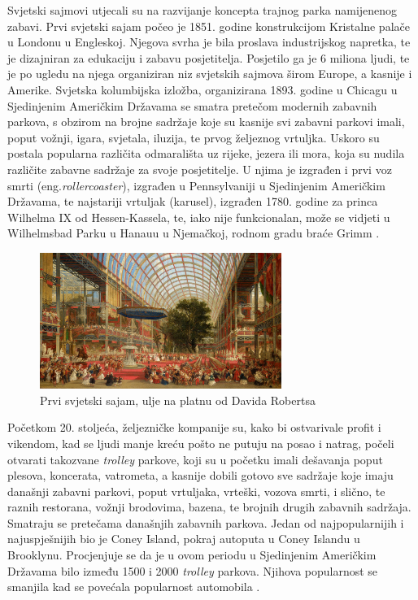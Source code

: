 Svjetski sajmovi utjecali su na razvijanje koncepta trajnog parka namijenenog zabavi. Prvi svjetski sajam počeo je 1851. godine konstrukcijom Kristalne palače u Londonu u Engleskoj. Njegova svrha je bila proslava industrijskog napretka, te je dizajniran za edukaciju i zabavu posjetitelja. Posjetilo ga je 6 miliona ljudi, te je po ugledu na njega organiziran niz svjetskih sajmova širom Europe, a kasnije i Amerike. Svjetska kolumbijska izložba, organizirana 1893. godine u Chicagu u Sjedinjenim Američkim Državama se smatra pretečom modernih zabavnih parkova, s obzirom na brojne sadržaje koje su kasnije svi zabavni parkovi imali, poput vožnji, igara, svjetala, iluzija, te prvog željeznog vrtuljka\cite{worldfairs}. Uskoro su postala popularna različita odmarališta uz rijeke, jezera ili mora, koja su nudila različite zabavne sadržaje za svoje posjetitelje. U njima je izgrađen i prvi voz smrti (eng.\textit{rollercoaster}), izgrađen u Pennsylvaniji u Sjedinjenim Američkim Državama, te najstariji vrtuljak (karusel), izgrađen 1780. godine za princa Wilhelma IX od Hessen-Kassela, te, iako nije funkcionalan, može se vidjeti u Wilhelmsbad Parku u Hanauu u Njemačkoj, rodnom gradu braće Grimm \cite{900years}. 

\begin{figure}[h!]
  \centering
  \includegraphics[width=0.7\textwidth]{fair}
  \caption{Prvi svjetski sajam, ulje na platnu od Davida Robertsa \cite{rct}}
  \label{fig:Slika_sajaml}
\end{figure}

Početkom 20. stoljeća, željezničke kompanije su, kako bi ostvarivale profit i vikendom, kad se ljudi manje kreću pošto ne putuju na posao i natrag, počeli otvarati takozvane \textit{trolley} parkove, koji su u početku imali dešavanja poput plesova, koncerata, vatrometa, a kasnije dobili gotovo sve sadržaje koje imaju današnji zabavni parkovi, poput vrtuljaka, vrteški, vozova smrti, i slično, te raznih restorana, vožnji brodovima, bazena, te brojnih drugih zabavnih sadržaja. Smatraju se pretečama današnjih zabavnih parkova. Jedan od najpopularnijih i najuspješnijih bio je Coney Island, pokraj autoputa u Coney Islandu u Brooklynu. Procjenjuje se da je u ovom periodu u Sjedinjenim Američkim Državama bilo između 1500 i 2000 \textit{trolley} parkova. Njihova popularnost se smanjila kad se povećala popularnost automobila \cite{kolica}.

